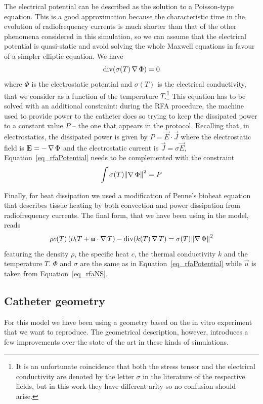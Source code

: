 The electrical potential can be described as the solution to a Poisson-type equation.
This is a good approximation because the characteristic time in the evolution of radiofrequency currents is much shorter than that of the other phenomena considered in this simulation, so we can assume that the electrical potential is quasi-static and avoid solving the whole Maxwell equations in favour of a simpler elliptic equation.
We have
\begin{equation}
  \operatorname{div}(\sigma(T)\operatorname{\nabla}\Phi) = 0
  \label{eq_rfaPotential}
\end{equation}
where \(\Phi\) is the electrostatic potential and \(\sigma(T)\) is the electrical conductivity, that we consider as a function of the temperature \(T\).\footnote{It is an unfortunate coincidence that both the stress tensor and the electrical conductivity are denoted by the letter \(\sigma\) in the literature of the respective fields, but in this work they have different arity so no confusion should arise.}
This equation has to be solved with an additional constraint: during the RFA procedure, the machine used to provide power to the catheter does so trying to keep the dissipated power to a constant value \(P\) -- the one that appears in the protocol.
Recalling that, in electrostatics, the dissipated power is given by \(P = \vec{E} \cdot \vec{J}\) where the electrostatic field is \(\mathbf{E} = -\operatorname{\nabla}\Phi\) and the electrostatic current is \(\vec{J} = \sigma \vec{E}\), Equation~\eqref{eq_rfaPotential} needs to be complemented with the constraint
\begin{equation}
  \int \sigma(T) \norm*{\grad\Phi}^2 = P
  \label{eq_rfaPowerConstraint}
\end{equation}

Finally, for heat dissipation we used a modification of Penne's bioheat equation that describes tissue heating by both convection and power dissipation from radiofrequency currents.
The final form, that we have been using in the model, reads
\begin{equation}
  \rho c(T) \left( \partial_{t} T + \vec{u} \cdot \grad T\right) - \div(k(T) \grad T) = \sigma(T) \norm*{\grad \Phi}^2
  \label{eq_rfaBioheat}
\end{equation}
featuring the density \(\rho\), the specific heat \(c\), the thermal conductivity \(k\) and the temperature \(T\).
\(\Phi\) and \(\sigma\) are the same as in Equation~\eqref{eq_rfaPotential} while \(\vec{u}\) is taken from Equation~\eqref{eq_rfaNS}.

\subsection{Catheter geometry}
\label{sub_rfaGeometry}
For this model we have been using a geometry based on the in vitro experiment that we want to reproduce.
The geometrical description, however, introduces a few improvements over the state of the art in these kinds of simulations.

